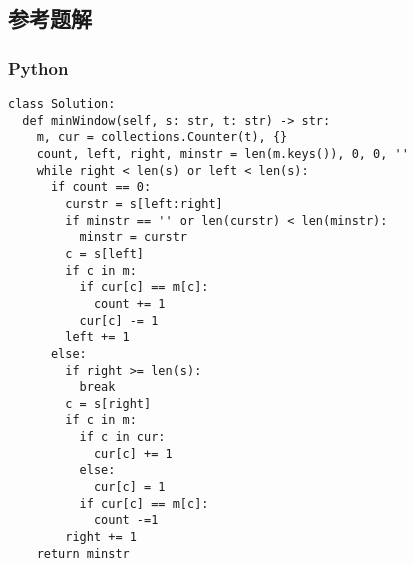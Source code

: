 \subsection{参考题解}

\subsubsection{Python}

\begin{verbatim}
class Solution:
  def minWindow(self, s: str, t: str) -> str:
    m, cur = collections.Counter(t), {}
    count, left, right, minstr = len(m.keys()), 0, 0, ''
    while right < len(s) or left < len(s):
      if count == 0:
        curstr = s[left:right]
        if minstr == '' or len(curstr) < len(minstr):
          minstr = curstr
        c = s[left]
        if c in m:
          if cur[c] == m[c]:
            count += 1
          cur[c] -= 1
        left += 1
      else:
        if right >= len(s):
          break
        c = s[right]
        if c in m:
          if c in cur:
            cur[c] += 1
          else:
            cur[c] = 1
          if cur[c] == m[c]:
            count -=1
        right += 1
    return minstr
\end{verbatim}

